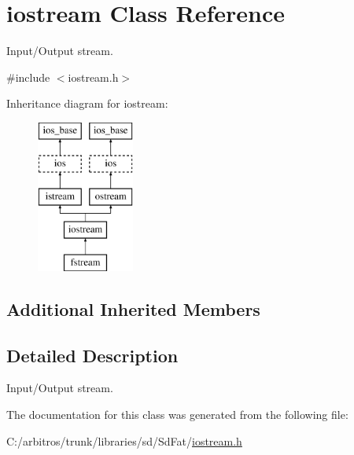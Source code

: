 \hypertarget{classiostream}{\section{iostream Class Reference}
\label{classiostream}
}


Input/\-Output stream.  




{\ttfamily \#include $<$iostream.\-h$>$}

Inheritance diagram for iostream\-:\begin{figure}[H]
\begin{center}
\leavevmode
\includegraphics[height=5.000000cm]{classiostream}
\end{center}
\end{figure}
\subsection*{Additional Inherited Members}


\subsection{Detailed Description}
Input/\-Output stream. 

The documentation for this class was generated from the following file\-:\begin{DoxyCompactItemize}
\item 
C\-:/arbitros/trunk/libraries/sd/\-Sd\-Fat/\hyperlink{iostream_8h}{iostream.\-h}\end{DoxyCompactItemize}
